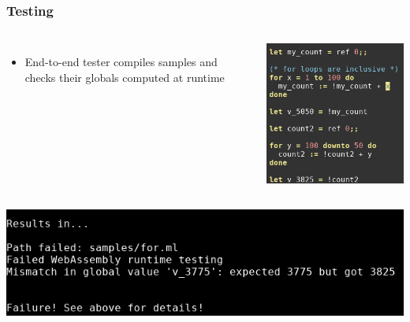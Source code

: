 \documentclass[12pt]{beamer}
\begin{document}
	\begin{frame}[fragile]
		\frametitle{Testing}
		\begin{columns}
			\begin{itemize}
				\item End-to-end tester compiles samples and checks their globals computed at runtime
			\end{itemize}
			\begin{center}
				\includegraphics[width=0.55\linewidth]{for-sample}
			\end{center}
			
		\end{columns}
		\begin{center}
			\includegraphics[width=0.6\linewidth]{e2e-output}
		\end{center}
	\end{frame}
\end{document}
